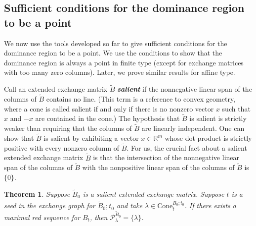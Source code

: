 \documentclass{amsart}
\newtheorem{theorem}[proposition]{Theorem}
\theoremstyle{definition}
\theoremstyle{remark}
\numberwithin{equation}{section}
\newcommand{\newword}[1]{\textbf{\emph{#1}}}
\newcommand{\reals}{\mathbb R}
\newcommand{\set}[1]{{\lbrace #1 \rbrace}}
\newcommand{\0}{{\mathbf{0}}}
\newcommand{\Cone}{\mathrm{Cone}}
\newcommand{\tB}{{\tilde{B}}}
\renewcommand{\P}{\mathcal{P}}
\newcommand{\sayN}[1]{\say[N]{#1}}
\begin{document}
\subsection{Sufficient conditions for the dominance region to be a point}\label{point sec}
We now use the tools developed so far to give sufficient conditions for the dominance region to be a point.
We use the conditions to show that the dominance region is always a point in finite type (except for exchange matrices with too many zero columns).
Later, we prove similar results for affine type.

Call an extended exchange matrix $\tB$ \newword{salient} if the nonnegative linear span of the columns of $\tB$ contains no line.
(This term is a reference to convex geometry, where a cone is called salient if and only if there is no nonzero vector $x$ such that $x$ and $-x$ are contained in the cone.)
The hypothesis that $\tB$ is salient is strictly weaker than requiring that the columns of $\tB$ are linearly independent.
One can show that $\tB$ is salient by exhibiting a vector $x\in\reals^m$ whose dot product is strictly positive with every nonzero column of $\tB$.
For us, the crucial fact \sayN{the ``salient point''?}
about a salient extended exchange matrix $\tB$ is that the intersection of the nonnegative linear span of the columns of $\tB$ with the nonpositive linear span of the columns of $\tB$ is $\set{0}$.

\begin{theorem}\label{P point}  
Suppose $\tB_0$ is a salient extended exchange matrix.
Suppose $t$ is a seed in the exchange graph for $\tB_0;t_0$ and take $\lambda\in\Cone^{\tB_0;t_0}_t$.
If there exists a maximal red sequence for $B_t$, then $\P^{\tB_0}_\lambda=\set{\lambda}$.
\end{theorem}
\end{document}
